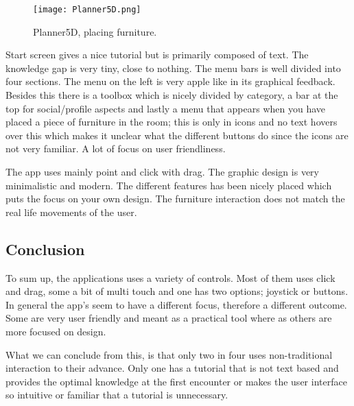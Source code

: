 \begin{figure}[H]
\centering
\texttt{[image: Planner5D.png]}
\caption{Planner5D, placing furniture.}
\end{figure}

Start screen gives a nice tutorial but is primarily composed of text. The knowledge gap is very tiny, close to nothing.
The menu bars is well divided into four sections.
The menu on the left is very apple like in its graphical feedback. Besides this there is a toolbox which is nicely divided by category, a bar at the top for social/profile aspects and lastly a menu that appears when you have placed a piece of furniture in the room; this is only in icons and no text hovers over this which makes it unclear what the different buttons do since the icons are not very familiar. A lot of focus on user friendliness. 

The app uses mainly point and click with drag.
The graphic design is very minimalistic and modern. The different features has been nicely placed which puts the focus on your own design. 
The furniture interaction does not match the real life movements of the user.

\subsection{Conclusion}

To sum up, the applications uses a variety of controls. Most of them uses click and drag, some a bit of multi touch and one has two options; joystick or buttons. 
In general the app's seem to have a different focus, therefore a different outcome. Some are very user friendly and meant as a practical tool where as others are more focused on design. 

What we can conclude from this, is that only two in four uses non-traditional interaction to their advance. Only one has a tutorial that is not text based and provides the optimal knowledge at the first encounter or makes the user interface so intuitive or familiar that a tutorial is unnecessary.
